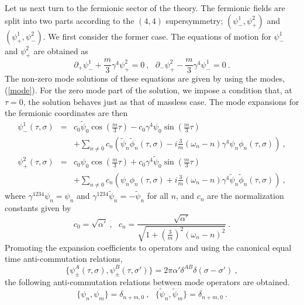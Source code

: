 \documentclass[a4paper,12pt]{article}
\numberwithin{equation}{section}
\begin{document}
Let us next turn to the fermionic sector of the theory. The fermionic
fields are split into two parts according to the $(4,4)$
supersymmetry; $(\psi^1_-, \psi^2_+)$ and $(\psi^1_+, \psi^2_-)$.  We
first consider the former case.  The equations of motion for
$\psi^1_-$ and $\psi^2_+$ are obtained as
\begin{equation}
\partial_+ \psi^1_- + \frac{m}{3} \gamma^4 \psi^2_+ = 0 ~,~~~
\partial_- \psi^2_+ - \frac{m}{3} \gamma^4 \psi^1_- = 0 ~.
\label{feom}
\end{equation}
The non-zero mode solutions of these equations are given by using the
modes, (\ref{mode}). For the zero mode part of the solution, we impose
a condition that, at $\tau=0$, the solution behaves just as that of
massless case.  The mode expansions for the fermionic coordinates are
then
\begin{eqnarray}
\psi^1_- (\tau, \sigma)
 &=& c_0 \tilde{\psi}_0 \cos \left( \frac{m}{3} \tau \right)
     - c_0 \gamma^4 \psi_0 \sin \left( \frac{m}{3} \tau \right)
                              \nonumber \\
 & & + \sum_{n \neq 0} c_n
      \left(
         \tilde{\psi}_n \tilde{\phi}_n (\tau, \sigma)
         - i \frac{3}{m} (\omega_n - n)
            \gamma^4 \psi_n \phi_n (\tau, \sigma )
      \right)~,
                               \nonumber \\
\psi^2_+ (\tau, \sigma)
 &=& c_0 \psi_0 \cos \left( \frac{m}{3} \tau \right)
     + c_0 \gamma^4 \tilde{\psi}_0
        \sin \left( \frac{m}{3} \tau \right)
                              \nonumber \\
 & & + \sum_{n \neq 0} c_n
      \left(
         \psi_n \phi_n (\tau, \sigma)
         + i \frac{3}{m} (\omega_n - n)
            \gamma^4 \tilde{\psi}_n \tilde{\phi}_n (\tau, \sigma )
      \right)~,
\label{fmode}
\end{eqnarray}
where $\gamma^{1234} \psi_n = \psi_n$ and $\gamma^{1234}
\tilde{\psi}_n = -\tilde{\psi}_n$ for all $n$, and $c_n$ are the
normalization constants given by
\[
c_0 = \sqrt{\alpha'}~,~~~
c_n = \frac{\sqrt{\alpha'}}{\sqrt{1 +
          \left( \frac{3}{m} \right)^2 (\omega_n - n)^2 } }~.
\]
Promoting the expansion coefficients to operators and using the
canonical equal time anti-commutation relations,
\begin{equation}
\{ \psi^A_\pm (\tau, \sigma), \psi^B_\pm (\tau, \sigma') \}
= 2 \pi \alpha' \delta^{AB} \delta (\sigma - \sigma') ~,
\label{fcom}
\end{equation}
the following anti-commutation relations between mode operators are
obtained.
\begin{equation}
\{ \psi_n , \psi_m \} = \delta_{n+m,0} ~,~~~
\{ \tilde{\psi}_n, \tilde{\psi}_m \} = \delta_{n+m,0}~.
\label{fmcom}
\end{equation}
\end{document}
